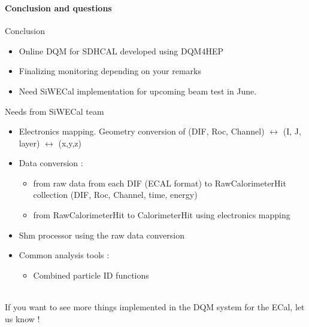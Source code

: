 \documentclass[8pt]{beamer}
\begin{document}
  \begin{frame}[containsverbatim]
    \frametitle{\secname}
    \framesubtitle{Conclusion and questions}
    \begin{block}{Conclusion}
      \begin{itemize}
        \item Online DQM for SDHCAL developed using DQM4HEP
        \item Finalizing monitoring depending on your remarks
        \item Need SiWECal implementation for upcoming beam test in June.
      \end{itemize}
    \end{block}
    \begin{block}{Needs from SiWECal team}
      \begin{itemize}
        \item Electronics mapping. Geometry conversion of (DIF, Roc, Channel) $\leftrightarrow$ (I, J, layer) $\leftrightarrow$ (x,y,z)
        \item Data conversion :
        \begin{itemize}
          \item from raw data from each DIF (ECAL format) to RawCalorimeterHit collection (DIF, Roc, Channel, time, energy)
          \item from RawCalorimeterHit to CalorimeterHit using electronics mapping
        \end{itemize}
        \item Shm processor using the raw data conversion
        \item Common analysis tools :
        \begin{itemize}
          \item Combined particle ID functions
        \end{itemize}
      \end{itemize}
      ~ \\
      If you want to see more things implemented in the DQM system for the ECal, let us know !

    \end{block}
  \end{frame}
\end{document}
